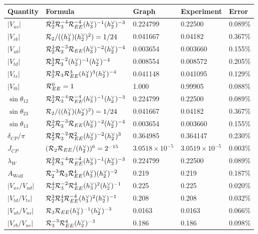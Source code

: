 \begin{center}
\label{tab:ckm_cat}
\begin{tabular}{lllll}
\hline\hline
Quantity & Formula & Graph & Experiment & Error \\
\hline
$|V_{us}|$ & $\mathcal{R}_2^3 \mathcal{R}_3^{-4} \mathcal{R}_{EE}^{-4} (h^\vee_3)^{-1} (h^\vee_2)^{-3}$ & 0.224799 & 0.22500 & 0.089\% \\
$|V_{cb}|$ & $\mathcal{R}_2/((h^\vee_3) (h^\vee_2)^2) = 1/24$ & 0.041667 & 0.04182 & 0.367\% \\
$|V_{ub}|$ & $\mathcal{R}_2^3 \mathcal{R}_3^{-3} \mathcal{R}_{EE} (h^\vee_3)^{-2} (h^\vee_2)^{-4}$ & 0.003654 & 0.003660 & 0.155\% \\
$|V_{td}|$ & $\mathcal{R}_2^3 \mathcal{R}_3^{-2} (h^\vee_3)^{-1} (h^\vee_2)^{-4}$ & 0.008554 & 0.008572 & 0.205\% \\
$|V_{ts}|$ & $\mathcal{R}_2^3 \mathcal{R}_3 \mathcal{R}_{EE}^3 (h^\vee_3)^3 (h^\vee_2)^{-4}$ & 0.041148 & 0.041095 & 0.129\% \\
$|V_{tb}|$ & $\mathcal{R}_{EE}^0 = 1$ & 1.000 & 0.99905 & 0.088\% \\
$\sin\theta_{12}$ & $\mathcal{R}_2^3 \mathcal{R}_3^{-4} \mathcal{R}_{EE}^{-4} (h^\vee_3)^{-1} (h^\vee_2)^{-3}$ & 0.224799 & 0.22500 & 0.089\% \\
$\sin\theta_{23}$ & $\mathcal{R}_2/((h^\vee_3) (h^\vee_2)^2) = 1/24$ & 0.041667 & 0.04182 & 0.367\% \\
$\sin\theta_{13}$ & $\mathcal{R}_2^3 \mathcal{R}_3^{-3} \mathcal{R}_{EE} (h^\vee_3)^{-2} (h^\vee_2)^{-4}$ & 0.003654 & 0.003660 & 0.155\% \\
$\delta_{CP}/\pi$ & $\mathcal{R}_2^2 \mathcal{R}_3^{-2} \mathcal{R}_{EE}^2 (h^\vee_3)^{-2} (h^\vee_2)^3$ & 0.364985 & 0.364147 & 0.230\% \\
$J_{CP}$ & $(\mathcal{R}_2 \mathcal{R}_{EE}/(h^\vee_2))^6 = 2^{-15}$ & $3.0518\times10^{-5}$ & $3.0519\times10^{-5}$ & 0.003\% \\
$\lambda_W$ & $\mathcal{R}_2^3 \mathcal{R}_3^{-4} \mathcal{R}_{EE}^{-4} (h^\vee_3)^{-1} (h^\vee_2)^{-3}$ & 0.224799 & 0.22500 & 0.089\% \\
$A_{\mathrm{Wolf}}$ & $\mathcal{R}_2^{-3} \mathcal{R}_3 \mathcal{R}_{EE}^4 (h^\vee_3) (h^\vee_2)^{-2}$ & 0.219 & 0.219 & 0.187\% \\
$|V_{us}/V_{ud}|$ & $\mathcal{R}_2^4 \mathcal{R}_3^{-2} \mathcal{R}_{EE}^4 (h^\vee_3)^2 (h^\vee_2)^{-1}$ & 0.225 & 0.225 & 0.020\% \\
$|V_{td}/V_{ts}|$ & $\mathcal{R}_2^3 \mathcal{R}_3^4 \mathcal{R}_{EE}^{-4} (h^\vee_3)^2 (h^\vee_2)^{-1}$ & 0.208 & 0.208 & 0.032\% \\
$|V_{ub}/V_{us}|$ & $\mathcal{R}_3 \mathcal{R}_{EE} (h^\vee_3)^{-1} (h^\vee_2)^{-3}$ & 0.0163 & 0.0163 & 0.066\% \\
$|V_{cb}/V_{us}|$ & $\mathcal{R}_3^{-3} \mathcal{R}_{EE}^4 (h^\vee_2)^{-3}$ & 0.186 & 0.186 & 0.098\% \\

\end{tabular}
\end{center}
